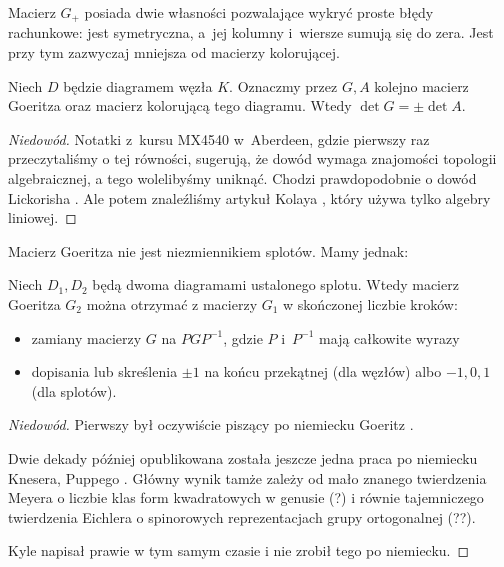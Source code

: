 Macierz $G_+$ posiada dwie własności pozwalające wykryć proste błędy rachunkowe: jest symetryczna, a~jej kolumny i~wiersze sumują się do zera.
Jest przy tym zazwyczaj mniejsza od macierzy kolorującej.

\begin{proposition}
    Niech $D$ będzie diagramem węzła $K$.
    Oznaczmy przez $G, A$ kolejno macierz Goeritza oraz macierz kolorującą tego diagramu.
    Wtedy  $\det G = \pm \det A$.
\end{proposition}

\begin{proof}[Niedowód]
    Notatki z~kursu MX4540 w~Aberdeen, gdzie pierwszy raz przeczytaliśmy o tej równości, sugerują, że dowód wymaga znajomości topologii algebraicznej, a tego wolelibyśmy uniknąć.
    Chodzi prawdopodobnie o dowód Lickorisha \cite[s. 99]{lickorish1997}.
    Ale potem znaleźliśmy artykuł Kolaya \cite{kolay2019}, który używa tylko algebry liniowej.
\end{proof}    

Macierz Goeritza nie jest niezmiennikiem splotów.
Mamy jednak:

\begin{proposition}
    Niech $D_1, D_2$ będą dwoma diagramami ustalonego splotu.
    Wtedy macierz Goeritza $G_2$ można otrzymać z macierzy $G_1$ w skończonej liczbie kroków:
    \begin{itemize}
        \item zamiany macierzy $G$ na $PGP^{-1}$, gdzie $P$ i~$P^{-1}$ mają całkowite wyrazy
        \item dopisania lub skreślenia $\pm 1$ na końcu przekątnej (dla węzłów) albo $-1, 0, 1$ (dla splotów).
    \end{itemize}
\end{proposition}

\begin{proof}[Niedowód]
%
%
%
%
    Pierwszy był oczywiście piszący po niemiecku Goeritz \cite{goeritz1933}.

    Dwie dekady później opublikowana została jeszcze jedna praca po niemiecku Knesera, Puppego \cite{kneser1953}.
    Główny wynik tamże zależy od mało znanego twierdzenia Meyera o liczbie klas form kwadratowych w genusie (?) i równie tajemniczego twierdzenia Eichlera o spinorowych reprezentacjach grupy ortogonalnej (??).

    Kyle napisał prawie w tym samym czasie \cite{kyle1954} i nie zrobił tego po niemiecku.
\end{proof}


